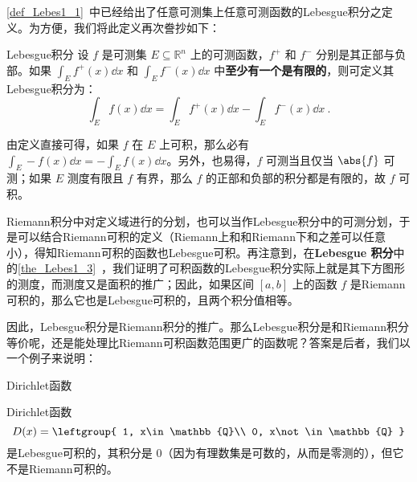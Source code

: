 

\autoref{def_Lebes1_1}~中已经给出了任意可测集上任意可测函数的Lebesgue积分之定义。为方便，我们将此定义再次誊抄如下：

\begin{definition}{Lebesgue积分}
设 $f$ 是可测集 $E\subseteq\mathbb{R}^n$ 上的可测函数，$f^+$ 和 $f^-$ 分别是其正部与负部。如果 $\int_E f^+(x) \dd x$ 和 $\int_E f^-(x) \dd x$ 中\textbf{至少有一个是有限的}，则可定义其Lebesgue积分为：
\begin{equation}
\int_E f(x) \dd x = \int_E f^+(x) \dd x - \int_E f^-(x) \dd x~.
\end{equation}
\end{definition}

由定义直接可得，如果 $f$ 在 $E$ 上可积，那么必有 $\int_E -f(x) \dd x = -\int_E f(x) \dd x$。另外，也易得，$f$ 可测当且仅当 $\abs{f}$ 可测；如果 $E$ 测度有限且 $f$ 有界，那么 $f$ 的正部和负部的积分都是有限的，故 $f$ 可积。



Riemann积分中对定义域进行的分划，也可以当作Lebesgue积分中的可测分划，于是可以结合Riemann可积的定义（Riemann上和和Riemann下和之差可以任意小），得知Riemann可积的函数也Lebesgue可积。再注意到，在\textbf{Lebesgue 积分}中的\autoref{the_Lebes1_3}~，我们证明了可积函数的Lebesgue积分实际上就是其下方图形的测度，而测度又是面积的推广；因此，如果区间 $[a, b]$ 上的函数 $f$ 是Riemann可积的，那么它也是Lebesgue可积的，且两个积分值相等。

因此，Lebesgue积分是Riemann积分的推广。那么Lebesgue积分是和Riemann积分等价呢，还是能处理比Riemann可积函数范围更广的函数呢？答案是后者，我们以一个例子来说明：

\begin{example}{Dirichlet函数}

Dirichlet函数
\begin{equation}
D(x)=
\leftgroup{
    1, x\in\mathbb{Q}\\
    0, x\not\in\mathbb{Q}
}
\end{equation}
是Lebesgue可积的，其积分是 $0$（因为有理数集是可数的，从而是零测的），但它不是Riemann可积的。

\end{example}
















